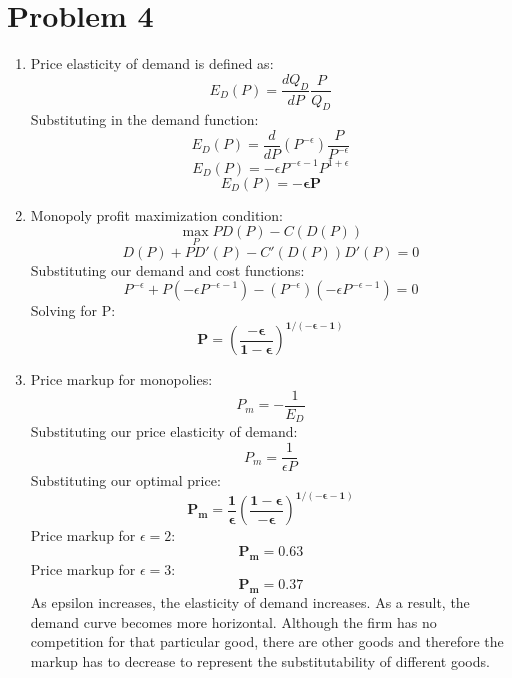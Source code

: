 \documentclass{article}
\begin{document}
\section*{Problem 4}

\begin{enumerate}

    \item Price elasticity of demand is defined as:
        \[E_{D}(P)=\frac{dQ_{D}}{dP}\frac{P}{Q_{D}}\]
        Substituting in the demand function:
        \[E_{D}(P)=\frac{d}{dP}(P^{-\epsilon})\frac{P}{P^{-\epsilon}}\]
        \[E_{D}(P)=-\epsilon P^{-\epsilon-1}P^{1+\epsilon}\]
        \[E_{D}(P)=\mathbf{-\epsilon P}\]
        
    \item Monopoly profit maximization condition:
        \[\max_{P} P D(P)-C(D(P))\]
        \[D(P)+P D'(P)-C'(D(P))D'(P)=0\]
        Substituting our demand and cost functions:
        \[P^{-\epsilon}+P(-\epsilon P^{-\epsilon-1})-(P^{-\epsilon})(-\epsilon
        P^{-\epsilon-1})=0\]
        Solving for P:
        \[\mathbf{P=\left(\frac{-\epsilon}{1-\epsilon}\right)^{1/(-\epsilon-1)}}\]
        
    \item Price markup for monopolies:
        \[P_{m}=-\frac{1}{E_{D}}\]
        Substituting our price elasticity of demand:
        \[P_{m}=\frac{1}{\epsilon P}\]
        Substituting our optimal price:
        \[\mathbf{P_{m}=\frac{1}{\epsilon}\left(\frac{1-\epsilon}{-\epsilon}\right)^{1/(-\epsilon-1)}}\]
        Price markup for \(\epsilon=2\):
        \[\mathbf{P_{m}=0.63}\]
        Price markup for \(\epsilon=3\):
        \[\mathbf{P_{m}=0.37}\]
        As epsilon increases, the elasticity of demand increases. As a result,
        the demand curve becomes more horizontal. Although the firm has no
        competition for that particular good, there are other goods and
        therefore the markup has to decrease to represent the substitutability
        of different goods.
        

\end{enumerate}
\end{document}
